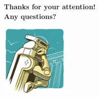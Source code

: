
\begin{frame}
\vspace{1cm}
\centering\textbf{Thanks for your attention!\\}
\vspace{0.7cm}
\centering\textbf{Any questions?\\}

\vspace{4ex}\hspace{22ex}\includegraphics[width=3.5cm]{../images/thinker.jpg}
\end{frame}
